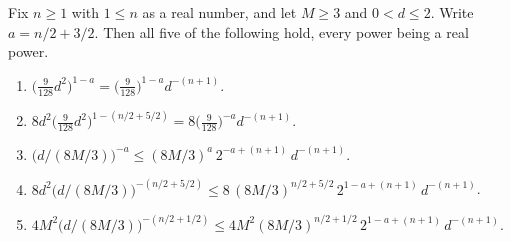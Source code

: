 \begin{lemma}
Fix $n \geq 1$ with $1 \leq n$ as a real number, and let $M \geq 3$ and
$0 < d \leq 2$.  Write $a = n/2+3/2$.  Then all five of the following hold, every
power being a real power.
\begin{enumerate}
  \item $\bigl(\tfrac{9}{128}d^2\bigr)^{1-a}
          = \bigl(\tfrac{9}{128}\bigr)^{1-a}d^{-(n+1)}$.
  \item $8d^2\bigl(\tfrac{9}{128}d^2\bigr)^{1-(n/2+5/2)}
          = 8\bigl(\tfrac{9}{128}\bigr)^{-a}d^{-(n+1)}$.
  \item $\bigl(d/(8M/3)\bigr)^{-a}
          \leq (8M/3)^{a}\,2^{-a+(n+1)}\,d^{-(n+1)}$.
  \item $8d^2\bigl(d/(8M/3)\bigr)^{-(n/2+5/2)}
          \leq 8\,(8M/3)^{n/2+5/2}\,2^{1-a+(n+1)}\,d^{-(n+1)}$.
  \item $4M^2\bigl(d/(8M/3)\bigr)^{-(n/2+1/2)}
          \leq 4M^2(8M/3)^{n/2+1/2}\,2^{1-a+(n+1)}\,d^{-(n+1)}$.
\end{enumerate}
\end{lemma}
